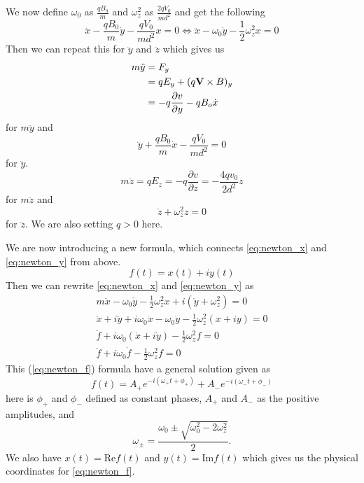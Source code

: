 \documentclass[english,notitlepage,reprint,nofootinbib]{revtex4-1}  %
\begin{document}
	We now define $\omega_0$ as $\frac{q B_0}{m}$ and $\omega_z^2$ as $\frac{2 q V_0}{md^2}$ and get the following
	\begin{equation} \label{eq:newton_x}
		\ddot{x} - \frac{q B_0}{m} \dot{y} - \frac{q V_0}{m d^2} x = 0 \Leftrightarrow \ddot{x} - \omega_0 \dot{y} - \frac{1}{2} \omega^2_z x = 0
	\end{equation}
	Then we can repeat this for $\ddot{y}$ and $\ddot{z}$ which gives us
	\begin{align*}
		m \ddot{y} &= F_y \\
		&= q E_y + (q \vectorbold{V} \times B)_y \\
		&= - q \frac{\partial v}{\partial y} - q B_o \dot{x}
	\end{align*}
	for $m \ddot{y}$ and 
	\begin{equation} \label{eq:newton_y}
		\ddot{y} + \frac{q B_0}{m} \dot{x} - \frac{q V_0}{m d^2} = 0
	\end{equation}
	for $\ddot{y}$.
	\begin{equation*}
		m \ddot{z} = q E_z = -q \frac{\partial v}{\partial z} = - \frac{4 q v_0}{2 d^2} z
	\end{equation*}
	for $m \ddot{z}$ and
	\begin{equation} \label{eq:newton_z}
		\ddot{z} + \omega^2_z z = 0
	\end{equation}
	for $\ddot{z}$. We are also setting $q > 0$ here.
	
	We are now introducing a new formula, which connects \ref{eq:newton_x} and \ref{eq:newton_y} from above.
	\begin{equation*}
		f(t) = x(t) + iy(t)
	\end{equation*}
	Then we can rewrite \ref{eq:newton_x} and \ref{eq:newton_y} as
	\begin{align} \label{eq:newton_f}
		m \ddot{x} - \omega_0 \dot{y} - \frac{1}{2} \omega_z^2 x + i(\ddot{y} + \omega_z^2) = 0 \nonumber \\
		\ddot{x} + i \ddot{y} + i \omega_0 \dot{x} - \omega_0 \dot{y} - \frac{1}{2} \omega_z^2 (x + iy) = 0 \nonumber \\
		\ddot{f} + i \omega_0 (\dot{x} + i \dot{y}) - \frac{1}{2} \omega_z^2 f = 0 \nonumber \\
		\ddot{f} + i \omega_0 \dot{f} - \frac{1}{2} \omega_z^2 f = 0
	\end{align}
	This (\ref{eq:newton_f}) formula have a general solution given as
	\begin{equation} \label{eq:gen_sol}
		f(t) = A_+ e^{-i(\omega_+ t + \phi_+)} + A_- e^{-i(\omega_- t + \phi_-)}
	\end{equation}
	here is $\phi_+$ and $\phi_-$ defined as constant phases, $A_+$ and $A_-$ as the positive amplitudes, and 
	\begin{equation*}
		\omega_\pm = \frac{\omega_0 \pm \sqrt{\omega_0^2 - 2\omega_z^2}}{2}.
	\end{equation*}
	We also have $x(t) = \text{Re} f(t)$ and $y(t) = \text{Im} f(t)$ which gives us the physical coordinates for \ref{eq:newton_f}.
	
\end{document}
